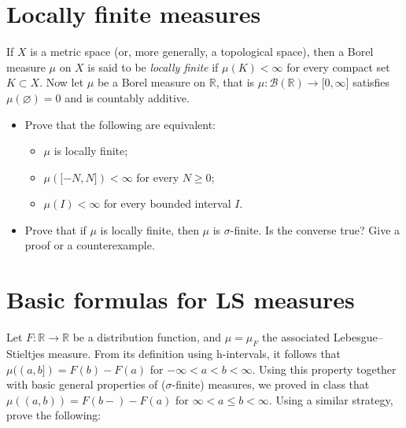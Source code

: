 \section{Locally finite measures}\label{locally-finite-measures}

If \(X\) is a metric space (or, more generally, a topological space), then a Borel measure \(\mu\) on \(X\) is said to be \emph{locally finite} if \(\mu(K) < \infty\) for every compact set \(K \subset X\). Now let \(\mu\) be a Borel measure on \(\mathbb{R}\), that is \(\mu:\mathcal{B}(\mathbb{R})\rightarrow\lbrack 0,\infty\rbrack\) satisfies \(\mu(\varnothing) = 0\) and is countably additive.

\begin{itemize}
\item
  Prove that the following are equivalent:

  \begin{itemize}
  \item
    \(\mu\) is locally finite;
  \item
    \(\mu(\lbrack - N,N\rbrack) < \infty\) for every \(N \geq 0\);
  \item
    \(\mu(I) < \infty\) for every bounded interval \(I\).
  \end{itemize}
\item
  Prove that if \(\mu\) is locally finite, then \(\mu\) is \(\sigma\)-finite. Is the converse true? Give a proof or a counterexample.
\end{itemize}

\section{Basic formulas for LS measures}\label{basic-formulas-for-ls-measures}

Let \(F:\mathbb{R}\rightarrow\mathbb{R}\) be a distribution function, and \(\mu = \mu_{F}\) the associated Lebesgue--Stieltjes measure. From its definition using h-intervals, it follows that \(\mu((a,b\rbrack) = F(b) - F(a)\) for \(- \infty < a < b < \infty\). Using this property together with basic general properties of (\(\sigma\)-finite) measures, we proved in class that \(\mu((a,b)) = F(b - ) - F(a)\) for \(\infty < a \leq b < \infty\). Using a similar strategy, prove the following:

